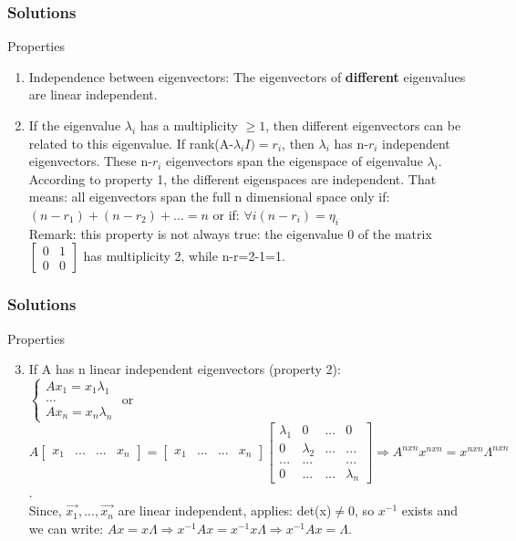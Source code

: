 \begin{frame}
	\frametitle{Solutions}
	\begin{block}{Properties}
		\begin{enumerate}
			\item Independence  between eigenvectors: The eigenvectors of \textbf{different} eigenvalues are linear independent. 
			\item If the eigenvalue $\lambda_i$ has a multiplicity $\geq 1$, then different eigenvectors can be related to this eigenvalue. If rank(A-$\lambda_i I)=r_i$, then $\lambda_i$ has n-$r_i$ independent eigenvectors. These n-$r_i$ eigenvectors span the eigenspace of eigenvalue $\lambda_i$.\\
			According to property 1, the different eigenspaces are independent. That means: all eigenvectors span the full n dimensional space only if:\\ $(n-r_1)+(n-r_2)+...=n$ or if: $\forall i (n-r_i)=\eta_i$\\
			Remark: this property is not always true: the eigenvalue 0 of the matrix $\begin{bmatrix}
			0 & 1\\0 & 0
			\end{bmatrix}$ has multiplicity 2, while n-r=2-1=1.
		\end{enumerate}
	\end{block}
\end{frame}

\begin{frame}
	\frametitle{Solutions}
	\begin{block}{Properties}
		\begin{enumerate}
			\setcounter{enumi}{2}
			\item If A  has n linear independent eigenvectors (property 2):\\
				$\begin{cases} Ax_1=x_1\lambda_1\\...\\Ax_n=x_n\lambda_n \end{cases}$ or $A\begin{bmatrix}
				x_1 & ... &...& x_n
				\end{bmatrix}=\begin{bmatrix}
				x_1 & ...&... & x_n
				\end{bmatrix}\begin{bmatrix}
				\lambda_1 & 0 &...& 0\\
				0&\lambda_2 & ... & ...\\
				...& ... & &...\\
				0&...&...&\lambda_n
				\end{bmatrix} \Rightarrow A^{nxn}x^{nxn}=x^{nxn}\Lambda^{nxn}$. \\
				Since, $\overrightarrow{x_1},...,\overrightarrow{x_n}$ are linear independent, applies: det(x)$\neq$0, so $x^{-1}$ exists and we can write: $Ax=x\Lambda \Rightarrow x^{-1} Ax=x^{-1}x\Lambda \Rightarrow x^{-1} Ax=\Lambda$.
		\end{enumerate}
	\end{block}
\end{frame}

